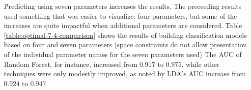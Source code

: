 \documentclass[letterpaper]{report}
\begin{document}
Predicting using seven parameters increases the results. The preceeding results used something that was easier to visualize: four parameters, but some of the increases are quite impactful when additional parameters are considered.  Table \ref{table:optimal-7-4-comparison} shows the results of building classification models based on four and seven parameters (space constraints do not allow presentation of the individual  parameter names for the seven parameters used) The AUC of Random Forest, for instance, increased from $0.917$ to $0.975$. while other techniques were only modestly improved, as noted by LDA's AUC increase from $0.924$ to $0.947$. 
{

%

}
\end{document}
